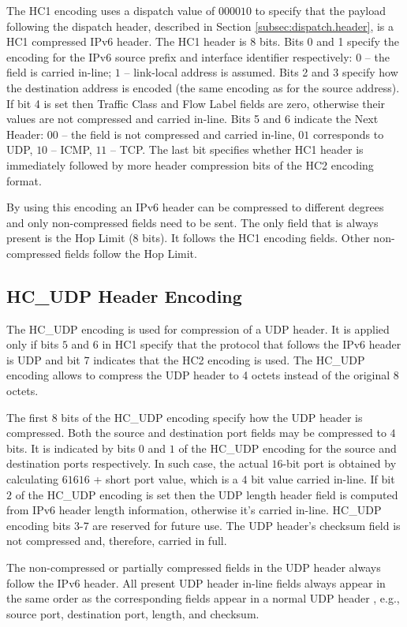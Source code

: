 \documentclass[12pt, titlepage, a4paper]{report}
\begin{document}
The HC1 encoding uses a dispatch value of $000010$ to specify that the payload following the dispatch header, described in Section \ref{subsec:dispatch.header}, is a HC1 compressed IPv6 header. The HC1 header is 8 bits. Bits 0 and 1 specify the encoding for the IPv6 source prefix and interface identifier respectively: $0$ -- the field is carried in-line; $1$ -- link-local address is assumed. Bits 2 and 3 specify how the destination address is encoded (the same encoding as for the source address). If bit 4 is set then  Traffic Class and Flow Label fields are zero, otherwise their values are not compressed and carried in-line. Bits 5 and 6 indicate the Next Header: $00$ -- the field is not compressed and carried in-line, $01$ corresponds to UDP, $10$ -- ICMP, $11$ -- TCP. The last bit specifies whether HC1 header is immediately followed by more header compression bits of the HC2 encoding format.

By using this encoding an IPv6 header can be compressed to different degrees and only non-compressed fields need to be sent. The only field that is always present is the Hop Limit (8 bits). It follows the HC1 encoding fields. Other non-compressed fields follow the Hop Limit.

\subsection{HC\_UDP Header Encoding}\label{sec:udp.header.enc}
The HC\_UDP encoding is used for compression of a UDP header. It is applied only if bits $5$ and $6$ in HC1 specify that the protocol that follows the IPv6 header is UDP and bit 7 indicates that the HC2 encoding is used. The HC\_UDP encoding allows to compress the UDP header to 4 octets instead of the original 8 octets.

The first $8$ bits of the HC\_UDP encoding specify how the UDP header is compressed. Both the source and destination port fields may be compressed to $4$ bits. It is indicated by bits $0$ and $1$ of the HC\_UDP encoding for the source and destination ports respectively. In such case, the actual $16$-bit port is obtained by calculating $61616$ + short port value, which is a $4$ bit value carried in-line. If bit $2$ of the HC\_UDP encoding is set then the UDP length header field is computed from IPv6 header length information, otherwise it's carried in-line. HC\_UDP encoding bits 3-7 are reserved for future use. The UDP header's checksum field is not compressed and, therefore, carried in full.

The non-compressed or partially compressed fields in the UDP header always follow the IPv6 header. All present UDP header in-line fields always appear in the same order as the corresponding fields appear in a normal UDP header \cite{rfc780}, e.g., source port, destination port, length, and checksum.
\end{document}
